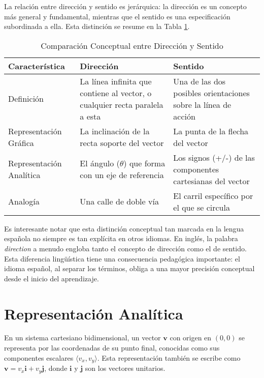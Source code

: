 \documentclass[conference]{IEEEtran}
\begin{document}
La relación entre dirección y sentido es jerárquica: la dirección es un concepto más general y fundamental, mientras que el sentido es una especificación subordinada a ella. Esta distinción se resume en la Tabla \ref{tab:comparacion}.

\begin{table}[htbp]
\caption{Comparación Conceptual entre Dirección y Sentido}
\begin{center}
\begin{tabular}{|p{2.2cm}|p{4.8cm}|p{4.8cm}|}
\hline
\textbf{Característica} & \textbf{Dirección} & \textbf{Sentido} \\
\hline
Definición & La línea infinita que contiene al vector, o cualquier recta paralela a esta & Una de las dos posibles orientaciones sobre la línea de acción \\
\hline
Representación Gráfica & La inclinación de la recta soporte del vector & La punta de la flecha del vector \\
\hline
Representación Analítica & El ángulo ($\theta$) que forma con un eje de referencia & Los signos (+/-) de las componentes cartesianas del vector \\
\hline
Analogía & Una calle de doble vía & El carril específico por el que se circula \\
\hline
\end{tabular}
\label{tab:comparacion}
\end{center}
\end{table}

Es interesante notar que esta distinción conceptual tan marcada en la lengua española no siempre es tan explícita en otros idiomas. En inglés, la palabra \emph{direction} a menudo engloba tanto el concepto de dirección como el de sentido. Esta diferencia lingüística tiene una consecuencia pedagógica importante: el idioma español, al separar los términos, obliga a una mayor precisión conceptual desde el inicio del aprendizaje.

\section{Representación Analítica}

En un sistema cartesiano bidimensional, un vector $\mathbf{v}$ con origen en $(0,0)$ se representa por las coordenadas de su punto final, conocidas como sus componentes escalares $\langle v_x, v_y \rangle$. Esta representación también se escribe como $\mathbf{v} = v_x \mathbf{i} + v_y \mathbf{j}$, donde $\mathbf{i}$ y $\mathbf{j}$ son los vectores unitarios.
\end{document}
